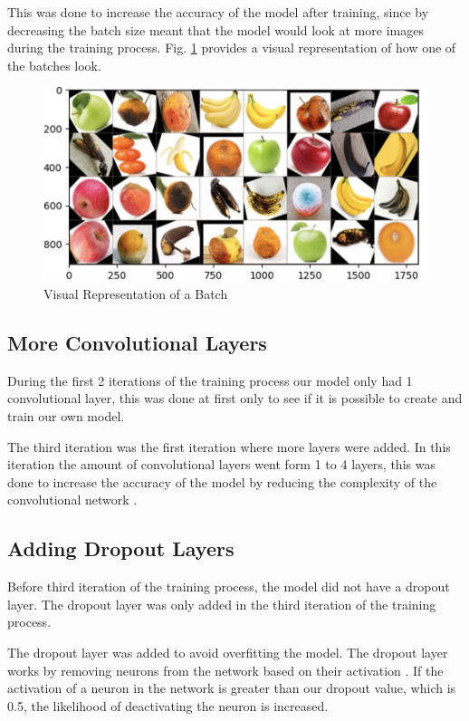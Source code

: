 \documentclass[conference]{IEEEtran}
\begin{document}
This was done to increase the accuracy of the model after training, since by decreasing the batch size meant that the model would look at more images during the training process. Fig. \ref{fig4} provides a visual representation of how one of the batches look.

\begin{figure}[h]
    \centering
    \includegraphics[width=\linewidth]{Batch_Representation.jpg}
    \caption{Visual Representation of a Batch}
    \label{fig4}
\end{figure}

\subsection{More Convolutional Layers}

During the first 2 iterations of the training process our model only had 1 convolutional layer, this was done at first only to see if it is possible to create and train our own model. 

The third iteration was the first iteration where more layers were added. In this iteration the amount of convolutional layers went form 1 to 4 layers, this was done to increase the accuracy of the model by reducing the complexity of the convolutional network \cite{b3}.

\subsection{Adding Dropout Layers}

Before third iteration of the training process, the model did not have a dropout layer. The dropout layer was only added in the third iteration of the training process.

The dropout layer was added to avoid overfitting the model. The dropout layer works by removing neurons from the network based on their activation \cite{b5}. If the activation of a neuron in the network is greater than our dropout value, which is 0.5, the likelihood of deactivating the neuron is increased.
\end{document}
